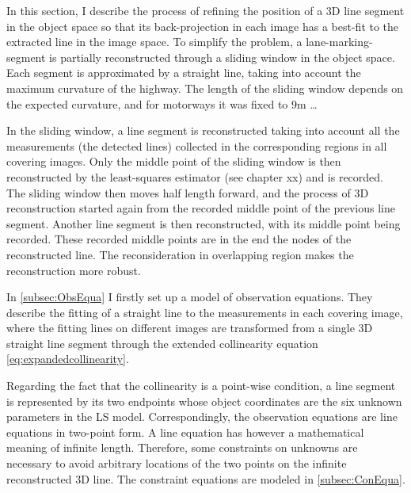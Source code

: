 In this section, I describe the process of refining the position of a 3D line segment in the object space so that its back-projection in each image has a best-fit to the extracted line in the image space. To simplify the problem, a lane-marking-segment is partially reconstructed through a sliding window in the object space. Each segment is approximated by a straight line, taking into account the maximum curvature of the highway. 
The length of the sliding window depends on the expected curvature, and for motorways it was fixed to 9m …

In the sliding window, a line segment is reconstructed taking into account all the measurements (the detected lines) collected in the corresponding regions in all covering images. Only the middle point of the sliding window is then reconstructed by the least-squares estimator (see chapter xx) %
and is recorded. The sliding window then moves half length forward, and the process of 3D reconstruction started again from the recorded middle point of the previous line segment. Another line segment is then reconstructed, with its middle point being recorded. These recorded middle points are in the end the nodes of the reconstructed line. The reconsideration in overlapping region makes the reconstruction more robust.

In \cref{subsec:ObsEqua} I firstly set up a model of observation equations. They describe the fitting of a straight line to the measurements in each covering image, where the fitting lines on different images are transformed from a single 3D straight line segment through the extended collinearity equation \eqref{eq:expandedcollinearity}.

Regarding the fact that the collinearity is a point-wise condition, a line segment is represented by its two endpoints whose object coordinates are the six unknown parameters %
in the LS model. %
Correspondingly, the observation equations are line equations in two-point form. A line equation has however a mathematical meaning of infinite length. Therefore, some constraints on unknowns are necessary to avoid arbitrary locations of the two points on the infinite reconstructed 3D line. The constraint equations are modeled in \cref{subsec:ConEqua}.






